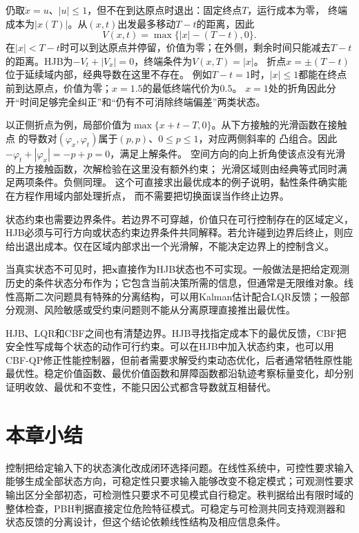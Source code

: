 \begin{example}[延续域内部的价值折点]
  \label{ex:control-viscosity-interior-kink}
  仍取$\dot x=u$、$|u|\leq1$，但不在到达原点时退出：固定终点$T$，运行成本为零，
  终端成本为$|x(T)|$。从$(x,t)$出发最多移动$T-t$的距离，因此
  \[
    V(x,t)=\max\{|x|-(T-t),0\}.
  \]
  在$|x|<T-t$时可以到达原点并停留，价值为零；在外侧，剩余时间只能减去$T-t$
  的距离。HJB为$-V_t+|V_x|=0$，终端条件为$V(x,T)=|x|$。
  折点$x=\pm(T-t)$位于延续域内部，经典导数在这里不存在。
  例如$T-t=1$时，$|x|\leq1$都能在终点前到达原点，价值为零；$x=1.5$的最低终端代价为$0.5$。
  $x=1$处的折角因此分开“时间足够完全纠正”和“仍有不可消除终端偏差”两类状态。

  以正侧折点为例，局部价值为$\max\{x+t-T,0\}$。从下方接触的光滑函数在接触点
  的导数对$(\varphi_x,\varphi_t)$属于$(p,p)$、$0\leq p\leq1$，对应两侧斜率的
  凸组合。因此$-\varphi_t+|\varphi_x|=-p+p=0$，满足上解条件。
  空间方向的向上折角使该点没有光滑的上方接触函数，次解检验在这里没有额外约束；
  光滑区域则由经典等式同时满足两项条件。负侧同理。
  这个可直接求出最优成本的例子说明，黏性条件确实能在方程作用域内部处理折点，
  而不需要把切换面误当作终止边界。
\end{example}

状态约束也需要边界条件。若边界不可穿越，价值只在可行控制存在的区域定义，HJB必须与可行方向或状态约束边界条件共同解释。若允许碰到边界后终止，则应给出退出成本。仅在区域内部求出一个光滑解，不能决定边界上的控制含义。

当真实状态不可见时，把$\bm{x}$直接作为HJB状态也不可实现。一般做法是把给定观测历史的条件状态分布作为；它包含当前决策所需的信息，但通常是无限维对象。线性高斯二次问题具有特殊的分离结构，可以用Kalman估计配合LQR反馈；一般部分观测、风险敏感或受约束问题则不能从分离原理直接推出最优性。

HJB、LQR和CBF之间也有清楚边界。HJB寻找指定成本下的最优反馈，CBF把安全性写成每个状态的动作可行约束。可以在HJB中加入状态约束，也可以用CBF-QP修正性能控制器，但前者需要求解受约束动态优化，后者通常牺牲原性能最优性。稳定价值函数、最优价值函数和屏障函数都沿轨迹考察标量变化，却分别证明收敛、最优和不变性，不能只因公式都含导数就互相替代。
\section{本章小结}
\label{sec:control-theory-summary}

控制把给定输入下的状态演化改成闭环选择问题。在线性系统中，可控性要求输入能够生成全部状态方向，可稳定性只要求输入能够改变不稳定模式；可观测性要求输出区分全部初态，可检测性只要求不可见模式自行稳定。秩判据给出有限时域的整体检查，PBH判据直接定位危险特征模式。可稳定与可检测共同支持观测器和状态反馈的分离设计，但这个结论依赖线性结构及相应信息条件。

